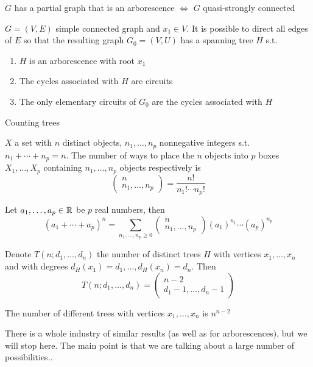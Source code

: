 \documentclass[aspectratio=169]{beamer}\usepackage[]{graphicx}\usepackage[]{xcolor}
\begin{document}
\begin{frame}
\begin{theorem}
$G$ has a partial graph that is an arborescence $\iff$ $G$ quasi-strongly connected
\end{theorem}
\vfill
\begin{theorem}
$G=(V,E)$ simple connected graph and $x_1\in V$. It is possible to direct all edges of $E$ so that the resulting graph $G_0=(V,U)$ has a spanning tree $H$ s.t.
\begin{enumerate}
	\item $H$ is an arborescence with root $x_1$
	\item The cycles associated with $H$ are circuits
	\item The only elementary circuits of $G_0$ are the cycles associated with $H$
\end{enumerate}
\end{theorem}
\end{frame}


\begin{frame}{Counting trees}
\begin{proposition}
$X$ a set with $n$ distinct objects, $n_1,\ldots,n_p$ nonnegative integers s.t. $n_1+\cdots+n_p=n$. The number of ways to place the $n$ objects into $p$ boxes $X_1,\ldots,X_p$ containing $n_1,\ldots,n_p$ objects respectively is 
\[
	\begin{pmatrix}
		n\\ n_1,\ldots,n_p
	\end{pmatrix}
	=
	\frac{n!}{n_1!\cdots n_p!}
\]
\end{proposition}
\vfill
\begin{proposition}
Let $a_1,\ldots,a_p\in\mathbb{R}$ be $p$ real numbers, then
\[
	(a_1+\cdots+a_p)^n= 
	\sum_{n_1,\ldots,n_p\geq 0}
	\begin{pmatrix}
		n\\ n_1,\ldots,n_p
	\end{pmatrix}
	(a_1)^{n_1}\cdots(a_p)^{n_p}	
\]
\end{proposition}
\end{frame}


\begin{frame} 
\begin{theorem}
Denote $T(n;d_1,\ldots,d_n)$ the number of distinct trees $H$ with vertices $x_1,\ldots,x_n$ and with degrees $d_H(x_1)=d_1,\ldots,d_H(x_n)=d_n$. Then
\[
	T(n;d_1,\ldots,d_n) = 
	\begin{pmatrix}
		n-2 \\
		d_1-1,\ldots,d_n-1
	\end{pmatrix}
\]
\end{theorem}
\vfill
\begin{theorem}
The number of different trees with vertices $x_1,\ldots,x_n$ is 
$n^{n-2}$
\end{theorem}
\vfill
There is a whole industry of similar results (as well as for arborescences), but we will stop here. The main point is that we are talking about a large number of possibilities..
\end{frame}



\end{document}
